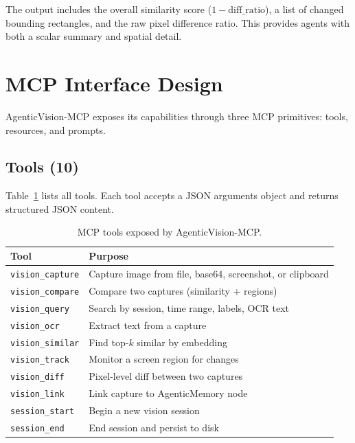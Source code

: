 \documentclass[10pt, twocolumn]{article}
\begin{document}
The output includes the overall similarity score ($1 - \text{diff\_ratio}$), a list of changed bounding rectangles, and the raw pixel difference ratio. This provides agents with both a scalar summary and spatial detail.

\section{MCP Interface Design}
\label{sec:mcp}

AgenticVision-MCP exposes its capabilities through three MCP primitives: tools, resources, and prompts.

\subsection{Tools (10)}

Table~\ref{tab:tools} lists all tools. Each tool accepts a JSON arguments object and returns structured JSON content.

\begin{table}[t]
\caption{MCP tools exposed by AgenticVision-MCP.}
\label{tab:tools}
\centering
\small
\begin{tabular}{@{}lp{4.2cm}@{}}
\toprule
\textbf{Tool} & \textbf{Purpose} \\
\midrule
\texttt{vision\_capture} & Capture image from file, base64, screenshot, or clipboard \\
\texttt{vision\_compare} & Compare two captures (similarity + regions) \\
\texttt{vision\_query} & Search by session, time range, labels, OCR text \\
\texttt{vision\_ocr} & Extract text from a capture \\
\texttt{vision\_similar} & Find top-$k$ similar by embedding \\
\texttt{vision\_track} & Monitor a screen region for changes \\
\texttt{vision\_diff} & Pixel-level diff between two captures \\
\texttt{vision\_link} & Link capture to AgenticMemory node \\
\texttt{session\_start} & Begin a new vision session \\
\texttt{session\_end} & End session and persist to disk \\
\bottomrule
\end{tabular}
\end{table}
\end{document}
